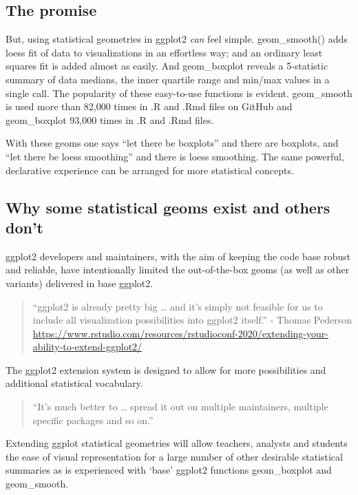 \documentclass[12pt]{article}
\begin{document}
\hypertarget{the-promise}{%
\subsection{The promise}\label{the-promise}}

But, using statistical geometries in ggplot2 \emph{can} feel simple.
geom\_smooth() adds loess fit of data to visualizations in an effortless
way; and an ordinary least squares fit is added almost as easily. And
geom\_boxplot reveals a 5-statistic summary of data medians, the inner
quartile range and min/max values in a single call. The popularity of
these easy-to-use functions is evident. geom\_smooth is used more than
82,000 times in .R and .Rmd files on GitHub and geom\_boxplot 93,000
times in .R and .Rmd files.

With these geoms one says ``let there be boxplots'' and there are
boxplots, and ``let there be loess smoothing'' and there is loess
smoothing. The same powerful, declarative experience can be arranged for
more statistical concepts.

\hypertarget{why-some-statistical-geoms-exist-and-others-dont}{%
\subsection{Why some statistical geoms exist and others
don't}\label{why-some-statistical-geoms-exist-and-others-dont}}

ggplot2 developers and maintainers, with the aim of keeping the code
base robust and reliable, have intentionally limited the out-of-the-box
geoms (as well as other variants) delivered in base ggplot2.

\begin{quote}
``ggplot2 is already pretty big \ldots{} and it's simply not feasible
for us to include all visualization possibilities into ggplot2 itself.''
- Thomas Pederson
\url{https://www.rstudio.com/resources/rstudioconf-2020/extending-your-ability-to-extend-ggplot2/}
\end{quote}

The ggplot2 extension system is designed to allow for more possibilities
and additional statistical vocabulary.

\begin{quote}
``It's much better to \ldots{} spread it out on multiple maintainers,
multiple specific packages and so on.''
\end{quote}

Extending ggplot statistical geometries will allow teachers, analysts
and students the ease of visual representation for a large number of
other desirable statistical summaries as is experienced with `base'
ggplot2 functions geom\_boxplot and geom\_smooth.
\end{document}
